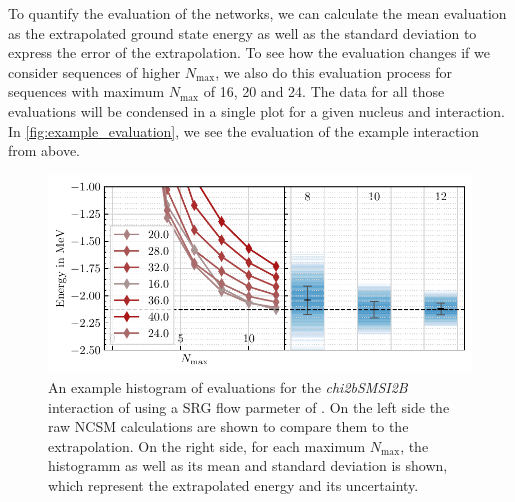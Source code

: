 To quantify the evaluation of the networks, we can calculate the mean evaluation as the extrapolated ground state energy as well as the standard deviation to express the error of the extrapolation. To see how the evaluation changes if we consider sequences of higher $N_\mathrm{max}$, we also do this evaluation process for sequences with maximum $N_\mathrm{max}$ of 16, 20 and 24. The data for all those evaluations will be condensed in a single plot for a given nucleus and interaction. In \autoref{fig:example_evaluation}, we see the evaluation of the example interaction from above.

\begin{figure}[H]
  \centering
  \includegraphics[]{media/example_evaluation.pdf}
  \caption{An example histogram of evaluations for the \textit{chi2bSMSI2B} interaction of  using a SRG flow parmeter of . On the left side the raw NCSM calculations are shown to compare them to the extrapolation. On the right side, for each maximum $N_\mathrm{max}$, the histogramm as well as its mean and standard deviation is shown, which represent the extrapolated energy and its uncertainty.}
  \label{fig:example_evaluation}
\end{figure}
